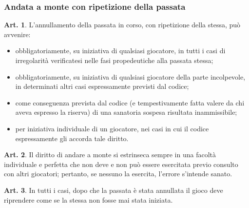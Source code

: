 \documentclass[italian,a4paper]{article}
\theoremstyle{definition}
\newtheorem{art}{Art.}
\newenvironment{packeditem}{
\begin{itemize}
  \setlength{\itemsep}{1pt}
  \setlength{\parskip}{0pt}
  \setlength{\parsep}{0pt}
}{\end{itemize}}
\begin{document}
\subsubsection{Andata a monte con ripetizione della passata}
\begin{art}
    L'annullamento della passata in corso, con ripetizione della stessa, può avvenire:
    \begin{packeditem}
\item      obbligatoriamente, su iniziativa di qualsiasi giocatore, in tutti i casi di irregolarità verificatesi nelle fasi propedeutiche alla passata stessa;
\item      obbligatoriamente, su iniziativa di qualsiasi giocatore della parte incolpevole, in determinati altri casi espressamente previsti dal codice;
\item       come conseguenza prevista dal codice (e tempestivamente fatta valere da chi aveva espresso la riserva) di una sanatoria sospesa risultata inammissibile;
\item      per iniziativa individuale di un giocatore, nei casi in cui il codice espressamente gli accorda tale diritto.
    \end{packeditem}
\end{art}
\begin{art}
    Il diritto di andare a monte si estrinseca sempre in una facoltà individuale e perfetta che non deve e non può essere esercitata previo consulto con altri giocatori; pertanto, se nessuno la esercita, l'errore s'intende sanato.
\end{art}
\begin{art}
    In tutti i casi, dopo che la passata è stata annullata il gioco deve riprendere come se la stessa non fosse mai stata iniziata.
\end{art}
\end{document}
